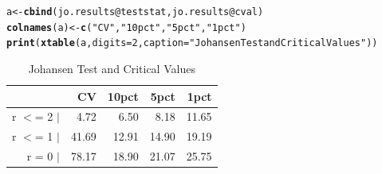 \documentclass{article}\usepackage{graphicx, color}
\makeatletter
\newcommand{\hlfunctioncall}[1]{\textcolor[rgb]{0.501960784313725,0,0.329411764705882}{\textbf{#1}}}%
\newcommand{\hlstring}[1]{\textcolor[rgb]{0.6,0.6,1}{#1}}%
\newenvironment{kframe}{%
 \def\at@end@of@kframe{}%
 \ifinner\ifhmode%
  \def\at@end@of@kframe{\end{minipage}}%
  \begin{minipage}{\columnwidth}%
 \fi\fi%
 \def\FrameCommand##1{\hskip\@totalleftmargin \hskip-\fboxsep
 \colorbox{shadecolor}{##1}\hskip-\fboxsep
     \hskip-\linewidth \hskip-\@totalleftmargin \hskip\columnwidth}%
 \MakeFramed {\advance\hsize-\width
   \@totalleftmargin\z@ \linewidth\hsize
   \@setminipage}}%
 {\par\unskip\endMakeFramed%
 \at@end@of@kframe}
\makeatother
\begin{document}
\begin{kframe}
\begin{alltt}
a <- \hlfunctioncall{cbind}(jo.results@teststat, jo.results@cval)
\hlfunctioncall{colnames}(a) <- \hlfunctioncall{c}(\hlstring{"CV"}, \hlstring{"10pct"}, \hlstring{"5pct"}, \hlstring{"1pct"})
\hlfunctioncall{print}(\hlfunctioncall{xtable}(a, digits = 2, caption = \hlstring{"Johansen Test and Critical Values"}))
\end{alltt}
\end{kframe}%
\begin{table}[ht]
\begin{center}
\begin{tabular}{rrrrr}
  \hline
 & CV & 10pct & 5pct & 1pct \\ 
  \hline
r $<$= 2 $|$ & 4.72 & 6.50 & 8.18 & 11.65 \\ 
  r $<$= 1 $|$ & 41.69 & 12.91 & 14.90 & 19.19 \\ 
  r = 0  $|$ & 78.17 & 18.90 & 21.07 & 25.75 \\ 
   \hline
\end{tabular}
\caption{Johansen Test and Critical Values}
\end{center}
\end{table}


\newpage


\end{document}
